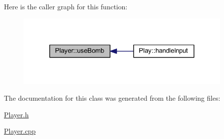 Here is the caller graph for this function\+:
\nopagebreak
\begin{figure}[H]
\begin{center}
\leavevmode
\includegraphics[width=300pt]{class_player_a1b9e6a1aebb4805e14bdefbb1566fb6d_icgraph}
\end{center}
\end{figure}


The documentation for this class was generated from the following files\+:\begin{DoxyCompactItemize}
\item 
\hyperlink{_player_8h}{Player.\+h}\item 
\hyperlink{_player_8cpp}{Player.\+cpp}\end{DoxyCompactItemize}

